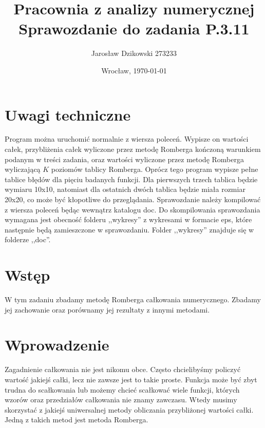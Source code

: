 \documentclass{article}
\author{Jarosław Dzikowski 273233}
\date{Wrocław, \today}
\title{\textbf{Pracownia z analizy numerycznej} \\ Sprawozdanie do zadania \textbf{P.3.11}}
\begin{document}
\maketitle
\section{Uwagi techniczne}
Program można uruchomić normalnie z wiersza poleceń. Wypisze on wartości całek, przybliżenia całek wyliczone
przez metodę Romberga kończoną warunkiem podanym w treści zadania, oraz wartości wyliczone przez
metodę Romberga wyliczającą $K$ poziomów tablicy Romberga.
\newline
\newline
Oprócz tego program wypisze pełne tablice błędów dla pięciu badanych funkcji. Dla pierwszych trzech tablica będzie
wymiaru 10x10, natomiast dla ostatnich dwóch tablica będzie miała rozmiar 20x20, co może być kłopotliwe
do przeglądania.
\newline
\newline
Sprawozdanie należy kompilować z wiersza poleceń będąc wewnątrz katalogu doc.
Do skompilowania sprawozdania wymagana jest obecność folderu ,,wykresy'' z wykresami w formacie eps, które następnie będą zamieszczone w sprawozdaniu. Folder ,,wykresy'' znajduje się w folderze ,,doc''.

\section{Wstęp}
W tym zadaniu zbadamy metodę Romberga całkowania numerycznego. Zbadamy jej zachowanie oraz porównamy jej rezultaty z innymi metodami.


\section{Wprowadzenie}
Zagadnienie całkowania nie jest nikomu obce. Często chcielibyśmy policzyć wartość jakiejś całki, lecz nie zawsze jest to takie proste.
Funkcja może być zbyt trudna do scałkowania lub możemy chcieć scałkować wiele funkcji, których wzorów oraz przedziałów całkowania nie znamy zawczasu.
Wtedy musimy skorzystać z jakiejś uniwersalnej metody obliczania przybliżonej wartości całki. Jedną z takich metod jest metoda Romberga.
\end{document}
